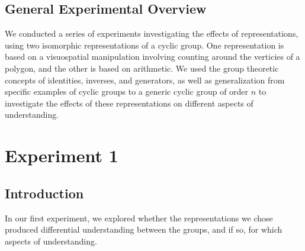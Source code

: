 \documentclass[11pt]{article}
\begin{document}
\subsection{General Experimental Overview}
We conducted a series of experiments investigating the effects of representations, using two isomorphic representations of a cyclic group. One representation is based on a visuospatial manipulation involving counting around the verticies of a polygon, and the other is based on arithmetic. We used the group theoretic concepts of identities, inverses, and generators, as well as generalization from specific examples of cyclic groups to a generic cyclic group of order $n$ to investigate the effects of these representations on different aspects of understanding. 
\section{Experiment 1}
\subsection{Introduction}
In our first experiment, we explored whether the representations we chose produced differential understanding between the groups, and if so, for which aspects of understanding.
\end{document}
